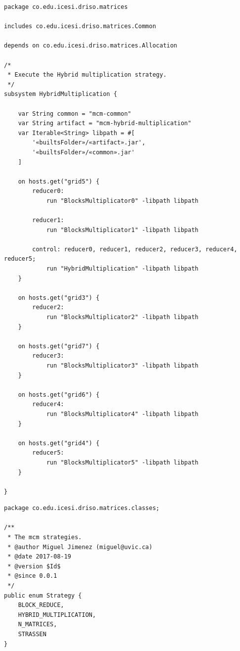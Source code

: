 \documentclass{article}
\begin{document}
\begin{lstlisting}[style=amelia,caption=Subsystem for Hybrid]
package co.edu.icesi.driso.matrices

includes co.edu.icesi.driso.matrices.Common

depends on co.edu.icesi.driso.matrices.Allocation

/*
 * Execute the Hybrid multiplication strategy.
 */
subsystem HybridMultiplication {
	
	var String common = "mcm-common"
	var String artifact = "mcm-hybrid-multiplication"
	var Iterable<String> libpath = #[
        '«builtsFolder»/«artifact».jar',
        '«builtsFolder»/«common».jar'
	]

    on hosts.get("grid5") {
        reducer0:
			run "BlocksMultiplicator0" -libpath libpath

        reducer1:
			run "BlocksMultiplicator1" -libpath libpath

        control: reducer0, reducer1, reducer2, reducer3, reducer4, reducer5;
			run "HybridMultiplication" -libpath libpath
	}
	
	on hosts.get("grid3") {
		reducer2:
			run "BlocksMultiplicator2" -libpath libpath
	}
	
	on hosts.get("grid7") {
		reducer3:
			run "BlocksMultiplicator3" -libpath libpath
	}
	
	on hosts.get("grid6") {
		reducer4:
			run "BlocksMultiplicator4" -libpath libpath
	}
	
	on hosts.get("grid4") {
		reducer5:
			run "BlocksMultiplicator5" -libpath libpath
	}
	
}
\end{lstlisting}

\begin{lstlisting}[style=amelia,caption=Enum]
package co.edu.icesi.driso.matrices.classes;

/**
 * The mcm strategies.
 * @author Miguel Jimenez (miguel@uvic.ca)
 * @date 2017-08-19
 * @version $Id$
 * @since 0.0.1
 */
public enum Strategy {
    BLOCK_REDUCE,
    HYBRID_MULTIPLICATION,
    N_MATRICES,
    STRASSEN
}

\end{lstlisting}
\end{document}
